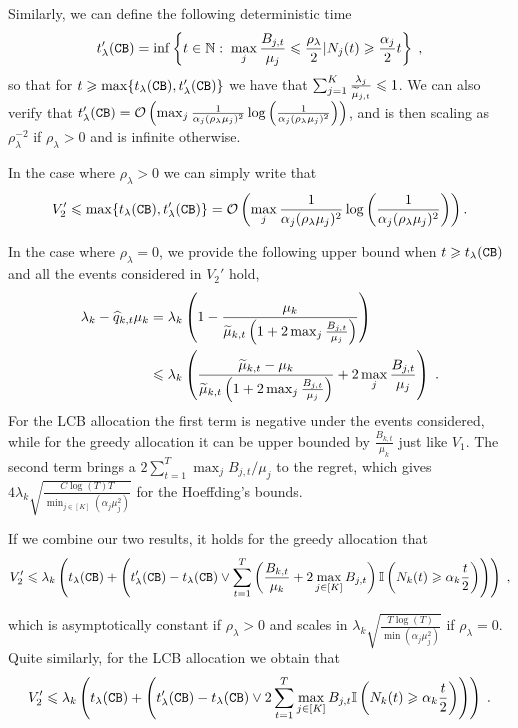 Similarly, we can define the following deterministic time
\[t_\lambda'(\texttt{CB})= \inf\left\{t \in \mathbb{N}: \; \max_j \frac{B_{j,t}}{\mu_j}\leqslant \frac{\rho_\lambda}{2} | N_j(t)\geqslant \frac{\alpha_j}{2}t \right\}\;,\] so that for $t\geqslant \max\{t_\lambda(\texttt{CB}), t_\lambda'(\texttt{CB})\}$ we have that $\sum_{j=1}^K \frac{\lambda_j}{\widetilde{\mu}_{j, t}} \leqslant 1$. We can also verify that $t_\lambda'(\texttt{CB})=\mathcal{O}\left(\max_j\frac{1}{\alpha_j(\rho_\lambda \mu_j)^2}\log\left(\frac{1}{\alpha_j(\rho_\lambda \mu_j)^2}\right)\right)$, and is then scaling as $\rho_\lambda^{-2}$ if $\rho_\lambda>0$ and is infinite otherwise.

In the case where $\rho_\lambda>0$ we can simply write that \[V_2' \leqslant \max\{t_\lambda(\texttt{CB}), t_\lambda'(\texttt{CB})\}= \mathcal{O}\left(\max_j\frac{1}{\alpha_j(\rho_\lambda\mu_j)^2}\log\left(\frac{1}{\alpha_j(\rho_\lambda\mu_j)^2}\right)\right).\]

In the case where $\rho_\lambda=0$, we provide the following upper bound when $t \geqslant t_\lambda(\texttt{CB})$ and all the events considered in $V_2'$ hold, 
\begin{align*}
\lambda_k - \widehat{q}_{k,t} \mu_k & = \lambda_k \left(1- \frac{\mu_k}{\widetilde{\mu}_{k, t}\left(1+2\max_j \frac{B_{j,t}}{\mu_j}\right)}\right) \\ 
& \leqslant \lambda_k \left(\frac{\widetilde{\mu}_{k,t}- \mu_k}{\widetilde{\mu}_{k, t}\left(1+2\max_j \frac{B_{j,t}}{\mu_j}\right)} +2\max_j \frac{B_{j,t}}{\mu_j} \right) \;.
\end{align*} 
For the LCB allocation the first term is negative under the events considered, while for the greedy allocation it can be upper bounded by $\frac{B_{k,t}}{\mu_k}$ just like $V_1$. The second term brings a $2\sum_{t=1}^T \max_j B_{j,t}/\mu_j$ to the regret, which gives $4\lambda_k\sqrt{\frac{C\log(T)T}{\min_{j \in [K]} (\alpha_j\mu_j^2)}}$ for the Hoeffding's bounds.

If we combine our two results, it holds for the greedy allocation that
\[ V_2' \leqslant \lambda_k\left(t_\lambda(\texttt{CB}) + \left(t_\lambda'(\texttt{CB})-t_\lambda(\texttt{CB}) \vee  \sum_{t=1}^T \left(\frac{B_{k,t}}{\mu_k}+2\max_{j\in[K]}B_{j,t}\right)\mathbb{I}\left(N_k(t)\geqslant \alpha_k\frac{t}{2}\right) \right)\right) \;,   \]

which is asymptotically constant if $\rho_\lambda>0$ and scales in $\lambda_k \sqrt{\frac{T\log(T)}{\min (\alpha_j \mu_j^2 )}}$ if $\rho_\lambda=0$. Quite similarly, for the LCB allocation we obtain that
\[ V_2' \leqslant \lambda_k\left(t_\lambda(\texttt{CB}) + \left(t_\lambda'(\texttt{CB})-t_\lambda(\texttt{CB}) \vee 2\sum_{t=1}^T \max_{j\in[K]}B_{j,t}\mathbb{I}\left(N_k(t)\geqslant \alpha_k\frac{t}{2}\right) \right)\right)  \;.   \]

